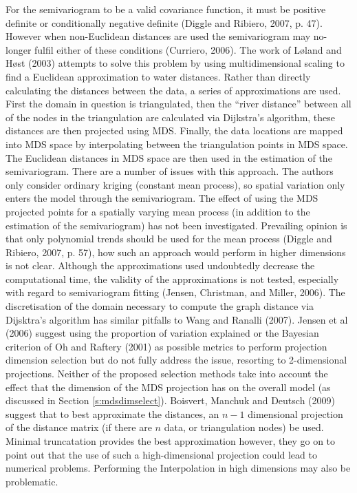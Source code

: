 \documentclass[useAMS, referee]{biom}
\begin{document}
For the semivariogram to be a valid covariance function, it must be positive definite or conditionally negative definite (Diggle and Ribiero, 2007, p. 47). However when non-Euclidean distances are used the semivariogram may no-longer fulfil either of these conditions (Curriero, 2006). The work of L{\o}land and H{\o}st (2003) attempts to solve this problem by using multidimensional scaling to find a Euclidean approximation to water distances. Rather than directly calculating the distances between the data, a series of approximations are used. First the domain in question is triangulated, then the ``river distance'' between all of the nodes in the triangulation are calculated via Dijkstra's algorithm, these distances are then projected using MDS. Finally, the data locations are mapped into MDS space by interpolating between the triangulation points in MDS space.  The Euclidean distances in MDS space are then used in the estimation of the semivariogram. There are a number of issues with this approach. The authors only consider ordinary kriging (constant mean process), so spatial variation only enters the model through the semivariogram. The effect of using the MDS projected points for a spatially varying mean process (in addition to the estimation of the semivariogram) has not been investigated. Prevailing opinion is that only polynomial trends should be used for the mean process (Diggle and Ribiero, 2007, p. 57), how such an approach would perform in higher dimensions is not clear. Although the approximations used undoubtedly decrease the computational time, the validity of the approximations is not tested, especially with regard to semivariogram fitting (Jensen, Christman, and Miller, 2006). The discretisation of the domain necessary to compute the graph distance via Dijsktra's algorithm has similar pitfalls to Wang and Ranalli (2007). Jensen et al (2006) suggest using the proportion of variation explained or the Bayesian criterion of Oh and Raftery (2001) as possible metrics to perform projection dimension selection but do not fully address the issue, resorting to 2-dimensional projections. Neither of the proposed selection methods take into account the effect that the dimension of the MDS projection has on the overall model (as discussed in Section \ref{s:mdsdimselect}). Boisvert, Manchuk and Deutsch (2009) suggest that to best approximate the distances, an $n-1$ dimensional projection of the distance matrix (if there are $n$ data, or triangulation nodes) be used. Minimal truncatation provides the best approximation however, they go on to point out that the use of such a high-dimensional projection could lead to numerical problems. Performing the Interpolation in high dimensions may also be problematic. 
\end{document}
